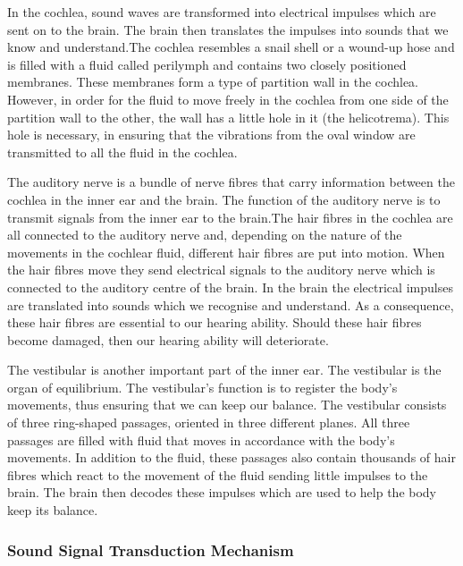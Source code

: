 \begin{enumerate}
	
	In the cochlea, sound waves are transformed into electrical impulses which are sent on to the brain. The brain then translates the impulses into sounds that we know and understand.The cochlea resembles a snail shell or a wound-up hose and is filled with a fluid called perilymph and contains two closely positioned membranes. These membranes form a type of partition wall in the cochlea. However, in order for the fluid to move freely in the cochlea from one side of the partition wall to the other, the wall has a little hole in it (the helicotrema). This hole is necessary, in ensuring that the vibrations from the oval window are transmitted to all the fluid in the cochlea.
	
	
	The auditory nerve is a bundle of nerve fibres that carry information between the cochlea in the inner ear and the brain. The function of the auditory nerve is to transmit signals from the inner ear to the brain.The hair fibres in the cochlea are all connected to the auditory nerve and, depending on the nature of the movements in the cochlear fluid, different hair fibres are put into motion. When the hair fibres move they send electrical signals to the auditory nerve which is connected to the auditory centre of the brain. In the brain the electrical impulses are translated into sounds which we recognise and understand. As a consequence, these hair fibres are essential to our hearing ability. Should these hair fibres become damaged, then our hearing ability will deteriorate.
	
	
	The vestibular is another important part of the inner ear. The vestibular is the organ of equilibrium. The vestibular's function is to register the body's movements, thus ensuring that we can keep our balance. The vestibular consists of three ring-shaped passages, oriented in three different planes. All three passages are filled with fluid that moves in accordance with the body's movements. In addition to the fluid, these passages also contain thousands of hair fibres which react to the movement of the fluid sending little impulses to the brain. The brain then decodes these impulses which are used to help the body keep its balance.
	
\end{enumerate}


\subsubsection{Sound Signal Transduction Mechanism}

